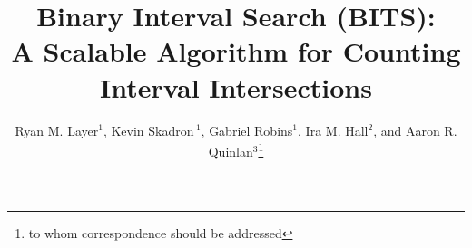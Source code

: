 \documentclass{bioinfo}
\begin{document}

\title[Optimal Interval Intersection Counting]{
Binary Interval Search (BITS):  \\
A Scalable Algorithm for Counting Interval Intersections}

\author[Layer \textit{et~al}]
{Ryan M. Layer$^1$, 
Kevin Skadron\,$^1$,
Gabriel Robins$^1$, 
Ira M. Hall$^2$,
and
Aaron R. Quinlan$^3$\footnote{to whom correspondence should be addressed}}

\address{$^{1}$Department of Computer Science, University of Virginia,
Charlottesville, VA\\
$^{2}$Department of Biochemistry and Molecular Genetics, University of Virginia, Charlottesville, VA\\
$^{3}$Department of Public Health Sciences and Center for Public Health
Genomics, University of Virginia, Charlottesville, VA}



\maketitle
\end{document}

